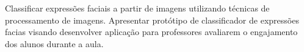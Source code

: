 Classificar expressões faciais a partir de imagens utilizando técnicas de processamento de imagens.
Apresentar protótipo de classificador de expressões facias visando desenvolver aplicação para professores avaliarem o engajamento dos alunos durante a aula.